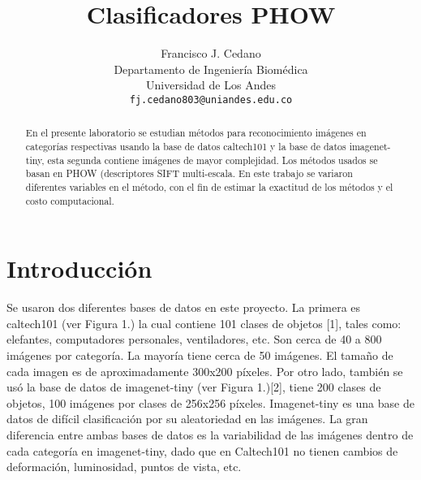 \documentclass[10pt,twocolumn,letterpaper]{article}
\begin{document}
\title{Clasificadores PHOW}

\author{Francisco J. Cedano\\
Departamento de Ingenier\'ia Biom\'edica\\
Universidad de Los Andes\\
{\tt\small fj.cedano803@uniandes.edu.co}
}%


\maketitle

\begin{abstract}
   En el presente laboratorio se estudian métodos para reconocimiento imágenes en categorías respectivas usando la base de datos caltech101 y la base de datos imagenet-tiny, esta segunda contiene imágenes de mayor complejidad. Los métodos usados se basan en PHOW (descriptores SIFT multi-escala. En este trabajo se variaron diferentes variables en el método, con el fin de estimar la exactitud de los métodos y el costo computacional.
   
\end{abstract}

\section{Introducción}

Se usaron dos diferentes bases de datos en este proyecto. La primera es caltech101 (ver Figura 1.) la cual contiene 101 clases de objetos [1], tales como: elefantes, computadores personales, ventiladores, etc. Son cerca de 40 a 800 imágenes por categoría. La mayoría tiene cerca de 50 imágenes. El tamaño de cada imagen es de aproximadamente 300x200 píxeles. Por otro lado, también se usó la base de datos de imagenet-tiny (ver Figura 1.)[2], tiene 200 clases de objetos, 100 imágenes por clases de 256x256 píxeles. Imagenet-tiny es una base de datos de difícil clasificación por su aleatoriedad en las imágenes. La gran diferencia entre ambas bases de datos es la variabilidad de las imágenes dentro de cada categoría en imagenet-tiny, dado que en Caltech101 no tienen cambios de deformación, luminosidad, puntos de vista, etc. 
\end{document}
